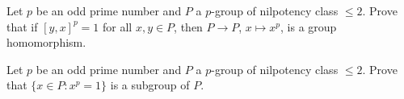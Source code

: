 
\begin{exercise}
\label{xca:class2_homomorphism}
Let $p$ be an odd prime number and 
$P$ a $p$-group of nilpotency class $\leq2$. 
Prove that if $[y,x]^p=1$ for all $x,y\in P$, then
$P\to P$,
$x\mapsto x^p$, is a group homomorphism. 
\end{exercise}


\begin{exercise}
\label{xca:class2_torsion}
Let $p$ be an odd prime number and 
$P$ a $p$-group of nilpotency class $\leq2$. 
Prove that $\{x\in P:x^p=1\}$ is a subgroup of $P$.
\end{exercise}

